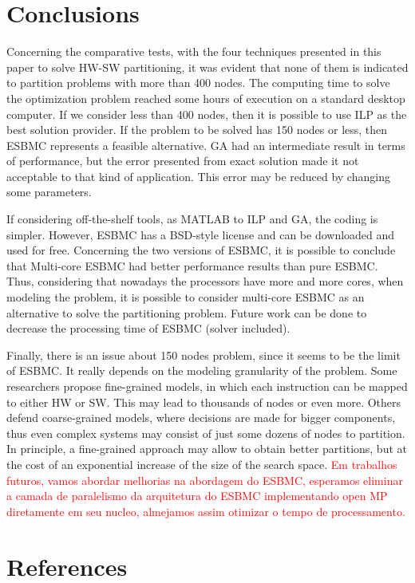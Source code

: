 \section{Conclusions}
Concerning the comparative tests, with the four techniques presented in this paper to solve HW-SW partitioning, it was evident that none of them is indicated to partition problems with more than 400 nodes. The computing time to solve the optimization problem reached some hours of execution on a standard desktop computer. If we consider less than 400 nodes, then it is possible to use ILP as the best solution provider. If the problem to be solved has 150 nodes or less, then ESBMC represents a feasible alternative. GA had an intermediate result in terms of performance, but the error presented from exact solution made it not acceptable to that kind of application. This error may be reduced by changing some parameters.

If considering off-the-shelf tools, as MATLAB to ILP and GA, the coding is simpler. However, ESBMC has a BSD-style license and can be downloaded and used for free. Concerning the two versions of ESBMC, it is possible to conclude that Multi-core ESBMC had better performance results than pure ESBMC. Thus, considering that nowadays the processors have more and more cores, when modeling the problem, it is possible to consider multi-core ESBMC as an alternative to solve the partitioning problem. Future work can be done to decrease the processing time of ESBMC (solver included).

Finally, there is an issue about 150 nodes problem, since it seems to be the limit of ESBMC. It really depends on the modeling granularity of the problem. Some researchers propose fine-grained models, in which each instruction can be mapped to either HW or SW. This may lead to thousands of nodes or even more. Others defend coarse-grained models, where decisions are made for bigger components, thus even complex systems may consist of just some dozens of nodes to partition. In principle, a fine-grained approach may allow to obtain better partitions, but at the cost of an exponential increase of the size of the search space. \textcolor{Red}{Em trabalhos futuros, vamos abordar melhorias na abordagem do ESBMC, esperamos eliminar a camada de paralelismo da arquitetura do ESBMC implementando open MP diretamente em seu nucleo, almejamos assim otimizar o tempo de processamento.}
\section{References}

